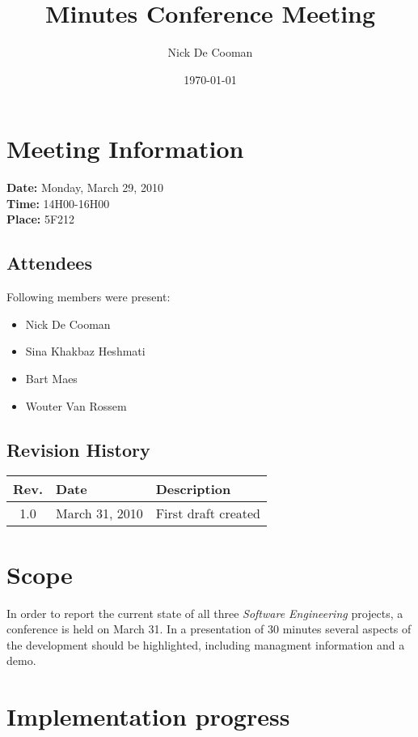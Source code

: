 \documentclass[a4paper, 12pt]{article}
\begin{document}
\title{Minutes Conference Meeting}
\author{Nick De Cooman}
\date{\today}

\maketitle	
	\section{Meeting Information}
		\textbf{Date:} Monday, March 29, 2010\\
		\textbf{Time:} 14H00-16H00\\
		\textbf{Place:} 5F212\\
		
		\subsection{Attendees}
Following members were present:
			\begin{itemize}
				\item Nick De Cooman
				\item Sina Khakbaz Heshmati
				\item Bart Maes
				\item Wouter Van Rossem
			\end{itemize}
			
		\subsection{Revision History}
			\begin{tabular}{c | l | l }
				\textbf{Rev.} & \textbf{Date} & \textbf{Description} \\
				\hline
				1.0 & March 31, 2010 & First draft created \\

			\end{tabular}		

\section{Scope}

In order to report the current state of all three \emph{Software Engineering} projects, a conference is held on March 31. In a presentation of 30 minutes several aspects of the development should be highlighted, including managment information and a demo. 

\section{Implementation progress}
\end{document}
